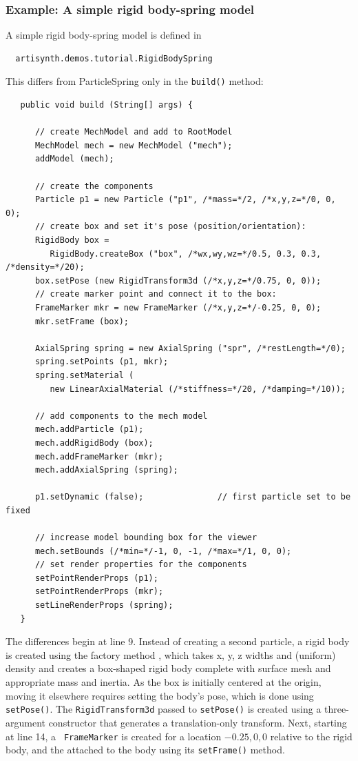 \subsubsection{Example: A simple rigid body-spring model}
\label{RigidBodySpringExample:sec}

A simple rigid body-spring model is defined in
%
\begin{verbatim}
  artisynth.demos.tutorial.RigidBodySpring
\end{verbatim}
%
This differs from ParticleSpring only in the {\tt build()} method:
\lstset{numbers=left}
\begin{lstlisting}
   public void build (String[] args) {

      // create MechModel and add to RootModel
      MechModel mech = new MechModel ("mech");
      addModel (mech);

      // create the components
      Particle p1 = new Particle ("p1", /*mass=*/2, /*x,y,z=*/0, 0, 0);
      // create box and set it's pose (position/orientation):
      RigidBody box =
         RigidBody.createBox ("box", /*wx,wy,wz=*/0.5, 0.3, 0.3, /*density=*/20);
      box.setPose (new RigidTransform3d (/*x,y,z=*/0.75, 0, 0));
      // create marker point and connect it to the box:
      FrameMarker mkr = new FrameMarker (/*x,y,z=*/-0.25, 0, 0);
      mkr.setFrame (box);

      AxialSpring spring = new AxialSpring ("spr", /*restLength=*/0);
      spring.setPoints (p1, mkr);
      spring.setMaterial (
         new LinearAxialMaterial (/*stiffness=*/20, /*damping=*/10));

      // add components to the mech model
      mech.addParticle (p1);
      mech.addRigidBody (box);
      mech.addFrameMarker (mkr);
      mech.addAxialSpring (spring);

      p1.setDynamic (false);               // first particle set to be fixed

      // increase model bounding box for the viewer
      mech.setBounds (/*min=*/-1, 0, -1, /*max=*/1, 0, 0);  
      // set render properties for the components
      setPointRenderProps (p1);
      setPointRenderProps (mkr);
      setLineRenderProps (spring);
   }
\end{lstlisting}
\lstset{numbers=none}
The differences begin at line 9. Instead of creating a second
particle, a rigid body is created using the factory method
, which
takes x, y, z widths and (uniform) density and creates a box-shaped
rigid body complete with surface mesh and appropriate mass and
inertia. As the box is initially centered at the origin, moving it
elsewhere requires setting the body's pose, which is done using {\tt
setPose()}. The {\tt RigidTransform3d} passed to {\tt setPose()} is
created using a three-argument constructor that generates a
translation-only transform.  Next, starting at line 14, a {\tt
FrameMarker} is created for a location $-0.25, 0, 0$ relative to the
rigid body, and the attached to the body using its {\tt setFrame()}
method.

